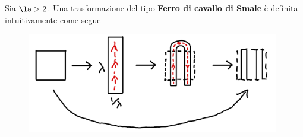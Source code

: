 \begin{definition}
Sia $\la>2$. Una trasformazione del tipo \textbf{Ferro di cavallo di Smale} \`e definita intuitivamente come segue
\begin{figure}[!htb]
    \centering
    \includegraphics[width=11cm]{Immagini/Ferro_di_cavallo_di_Smale.png}
\end{figure}
\end{definition}




